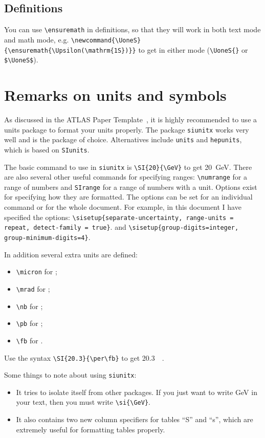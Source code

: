 \documentclass[UKenglish]{style/atlasdoc}
\begin{document}
\subsection{Definitions}

You can use \verb|\ensuremath| in definitions, so that they will work
in both text mode and math mode, e.g.
\verb|\newcommand{\UoneS}{\ensuremath{\Upsilon(\mathrm{1S})}}| to get
\UoneS{} in either mode (\verb|\UoneS{}| or \verb|$\UoneS$|).


\section{Remarks on units and symbols}

As discussed in the ATLAS Paper Template~\cite{atlas-paper},
it is highly recommended to use a units package to format your units properly.
The package \texttt{siunitx} works very well and is the package of choice.
Alternatives include \texttt{units} and \texttt{hepunits},
which is based on \texttt{SIunits}.

The basic command to use in \texttt{siunitx} is \verb|\SI{20}{\GeV}| to get
\SI{20}{\GeV}. 
There are also several other useful commands for specifying ranges:
\verb|\numrange| for a range of numbers and \verb|SIrange| for a range of numbers with a unit. 
Options exist for specifying how they are formatted.
The options can be set for an individual command or for the whole document.
For example, in this document I have specified the options:
\verb|\sisetup{separate-uncertainty, range-units = repeat, detect-family = true}|.
and
\verb|\sisetup{group-digits=integer, group-minimum-digits=4}|.

In addition several extra units are defined:
\begin{itemize}
\item \verb|\micron| for \si{\micron};
\item \verb|\mrad| for \si{\mrad};
\item \verb|\nb| for \si{\nb};
\item \verb|\pb| for \si{\pb};
\item \verb|\fb| for \si{\fb}.
\end{itemize}
Use the syntax \verb|\SI{20.3}{\per\fb}| to get \SI{20.3}{\per\fb}.

Some things to note about using \texttt{siunitx}:
\begin{itemize}
\item It tries to isolate itself from other packages.
	If you just want to write \si{\GeV} in your text,
	then you must write \verb|\si{\GeV}|.
\item It also contains two new column specifiers for tables ``S'' and ``s'',
	which are extremely useful for formatting tables properly.
\end{itemize}
\end{document}
